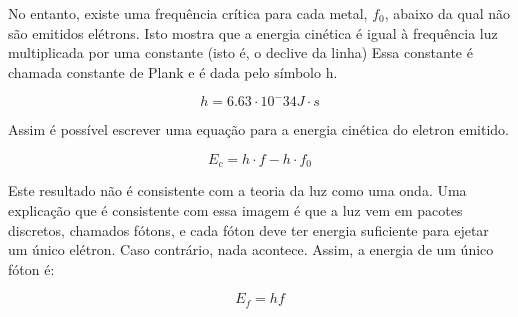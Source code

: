 No entanto, existe uma frequência crítica para cada metal, $f_0$, abaixo da qual não são emitidos elétrons. Isto mostra que a energia cinética é igual à frequência luz multiplicada por uma constante (isto é, o declive da linha) Essa constante é chamada constante de Plank e é dada pelo símbolo h.

\begin{equation}\label{const_plank}
	h= 6.63\cdot 10^-34 J\cdot s 
\end{equation}

Assim é possível escrever uma equação para a energia cinética do eletron emitido.

\begin{equation}
	E_c= h\cdot f - h\cdot f_0
\end{equation}

Este resultado não é consistente com a teoria da luz como uma onda. Uma explicação que é consistente com essa imagem é que a luz vem em pacotes discretos, chamados fótons, e cada fóton deve ter energia suficiente para ejetar um único elétron. Caso contrário, nada acontece. Assim, a energia de um único fóton é:

\begin{equation}
	E_f=hf
\end{equation}
